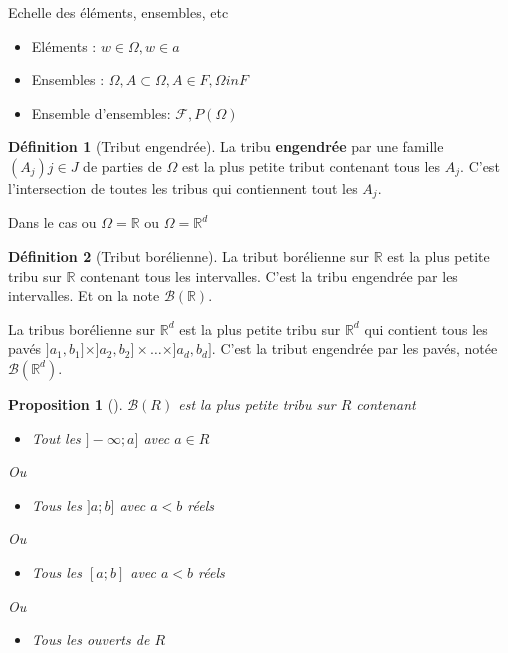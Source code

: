 \documentclass{article}
\theoremstyle{plain}%
\newtheorem{prop}[thm]{Proposition}
\theoremstyle{definition}
\newtheorem{defn}{Définition}[section]
\theoremstyle{remark}
\begin{document}
Echelle des éléments, ensembles, etc
\begin{itemize}
    \item Eléments : $ w \in \Omega, w \in a $ 
    \item Ensembles : $ \Omega, A \subset \Omega, A \in F, \Omega in F $ 
    \item Ensemble d'ensembles: $ \mathcal{F}, P(\Omega )$ 
\end{itemize}
\begin{defn}[Tribut engendrée]
    La tribu \textbf{engendrée} par une famille $ (A_j){j \in J} $ de parties de $ \Omega  $ est la plus petite tribut contenant tous les $ A_j $. C'est l'intersection de toutes les tribus qui contiennent tout les $ A_j $.
\end{defn}
Dans le cas ou $ \Omega = \mathbb{R} $ ou $ \Omega = \mathbb{R}^d $ 
\begin{defn}[Tribut borélienne]
    La tribut borélienne sur $ \mathbb{R} $ est la plus petite tribu sur $ \mathbb{R} $  contenant tous les intervalles. C'est la tribu engendrée par les intervalles. Et on la note $ \mathcal{B}(\mathbb{R}) $.

    La tribus borélienne sur $ \mathbb{R}^d $ est la plus petite tribu sur $ \mathbb{R}^d $ qui contient tous les pavés $ ]a_1, b_1] \times  ]a_2,b_2] \times \dots \times ]a_d,b_d]$. C'est la tribut engendrée par les pavés, notée $ \mathcal{B}(\mathbb{R}^d) $.
\end{defn}
\begin{prop}[]
    $ \mathcal{B}(R) $ est la plus petite tribu sur $ R $ contenant \begin{itemize}
        \item Tout les $ ]-\infty ; a] $ avec $ a \in R $ 
    \end{itemize}
    Ou 
    \begin{itemize}
        \item Tous les $ ]a;b] $ avec $ a<b $ réels
    \end{itemize}
    Ou 
    \begin{itemize}
        \item Tous les $ [a;b] $ avec $ a<b $ réels
    \end{itemize}
    Ou
    \begin{itemize}
        \item Tous les ouverts de $ R $ 
    \end{itemize}
\end{prop}
\end{document}
